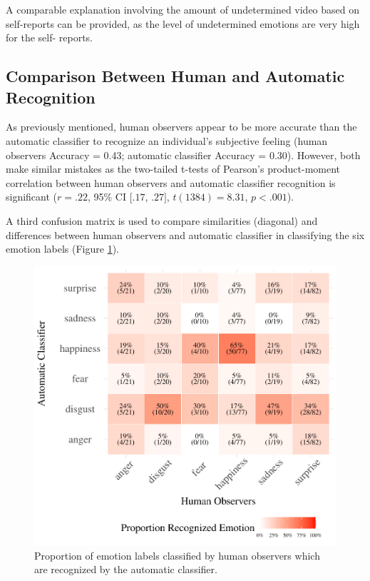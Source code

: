 \documentclass[
  english,
  doc]{apa7}
\begin{document}
A comparable explanation involving the amount of undetermined video based on self-reports can be provided, as the level of undetermined emotions are very high for the self- reports.

\hypertarget{comparison-between-human-and-automatic-recognition}{%
\subsection{Comparison Between Human and Automatic Recognition}\label{comparison-between-human-and-automatic-recognition}}

As previously mentioned, human observers appear to be more accurate than the automatic classifier to recognize an individual's subjective feeling (human observers Accuracy = 0.43; automatic classifier Accuracy = 0.30). However, both make similar mistakes as the two-tailed t-tests of Pearson's product-moment correlation between human observers and automatic classifier recognition is significant (\(r = .22\), 95\% CI \([.17\), \(.27]\), \(t(1384) = 8.31\), \(p < .001\)).

A third confusion matrix is used to compare similarities (diagonal) and differences between human observers and automatic classifier in classifying the six emotion labels (Figure \ref{fig:confusionMatrix-hr-ar}).

\begin{figure}[!h]
\includegraphics[width=\textwidth]{manuscript_apa_files/figure-latex/confusionMatrix-hr-ar-1} \caption{Proportion of emotion labels classified by human observers which are recognized by the automatic classifier.}\label{fig:confusionMatrix-hr-ar}
\end{figure}
\end{document}
